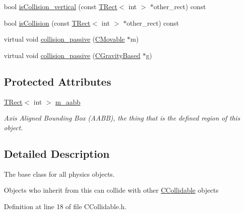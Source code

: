 \begin{DoxyCompactItemize}
bool \hyperlink{classengine_1_1CCollidable_a6257421db6a378f596fdacd037188f34}{is\-Collision\-\_\-vertical} (const \hyperlink{classengine_1_1TRect}{T\-Rect}$<$ int $>$ $\ast$other\-\_\-rect) const 
\item 
bool \hyperlink{classengine_1_1CCollidable_afd5adee0a4b0a4f18ff2bdcda656c632}{is\-Collision} (const \hyperlink{classengine_1_1TRect}{T\-Rect}$<$ int $>$ $\ast$other\-\_\-rect) const 
\item 
virtual void \hyperlink{classengine_1_1CCollidable_a9ffb8b1a1fcd9818f9b6140bf00d7e26}{collision\-\_\-passive} (\hyperlink{classengine_1_1CMovable}{C\-Movable} $\ast$m)
\item 
virtual void \hyperlink{classengine_1_1CCollidable_aca2e7d122088f07696079141c93724f3}{collision\-\_\-passive} (\hyperlink{classengine_1_1CGravityBased}{C\-Gravity\-Based} $\ast$g)
\end{DoxyCompactItemize}
\subsection*{Protected Attributes}
\begin{DoxyCompactItemize}
\item 
\hyperlink{classengine_1_1TRect}{T\-Rect}$<$ int $>$ \hyperlink{classengine_1_1CCollidable_aca283a2f940e99dcd6b0f57e7812968d}{m\-\_\-aabb}
\begin{DoxyCompactList}\small\item\em Axis Aligned Bounding Box (A\-A\-B\-B), the thing that is the defined region of this object. \end{DoxyCompactList}\end{DoxyCompactItemize}


\subsection{Detailed Description}
The base class for all physics objects. 

Objects who inherit from this can collide with other \hyperlink{classengine_1_1CCollidable}{C\-Collidable} objects 

Definition at line 18 of file C\-Collidable.\-h.




